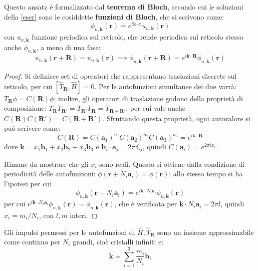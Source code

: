 \documentclass[10pt, a4paper]{scrartcl}
\numberwithin{equation}{subsection}
\theoremstyle{style1}
\begin{document}
Questo ansatz \`e formalizzato dal \textbf{teorema di Bloch}, secondo cui le soluzioni della \ref{eser} sono le cosiddette \textbf{funzioni di Bloch}, che si scrivono come:
\begin{equation}
	\phi _{n, \mathbf{k} } (\mathbf{r} ) = e^{i \mathbf{k} \cdot \mathbf{r} } u _{n, \mathbf{k} } (\mathbf{r} )
\end{equation}
con $u_{n, \mathbf{k} } $ funzione periodica sul reticolo, che rende periodica sul reticolo stesso anche  $\phi _{n,\mathbf{k} } $, a meno di una fase:
\[
u_{n,\mathbf{k} } (\mathbf{r} + \mathbf{R} ) = u_{n,\mathbf{k} } (\mathbf{r} ) \implies \phi _{n,\mathbf{k} } (\mathbf{r} + \mathbf{R} ) = e^{i \mathbf{k} \cdot \mathbf{R} } \phi _{n,\mathbf{k} } (\mathbf{r} ) 
\] 
\begin{proof}
	Si  definisce set di operatori che rappresentano traslazioni discrete sul reticolo, per cui $[\hat{T}_\mathbf{R} , \hat{H}] = 0$. Per le autofunzioni simultanee dei due varr\`a: $T_\mathbf{R} \phi  = C(\mathbf{R} ) \phi $; inoltre, gli operatori di traslazione godono della propriet\`a di composizione: $T_\mathbf{R} T_{\mathbf{R}'}  = T_{\mathbf{R} '}  T_\mathbf{R} = T_{\mathbf{R} + \mathbf{R} '} $, per cui vale anche $C(\mathbf{R} ) C(\mathbf{R} ') = C(\mathbf{R} +\mathbf{R} ')$. Sfruttando questa propriet\`a, ogni autovalore si pu\`o scrivere come:
	\begin{equation}
		C( \mathbf{R} ) = C( \mathbf{a} _1) ^{n_1} C(\mathbf{a} _2)^{n_2} C(\mathbf{a} _3) ^{n_3} = e^{ i \mathbf{k} \cdot \mathbf{R} } 
	\end{equation}
dove $\mathbf{k} = x_1 \mathbf{b} _1 + x_2 \mathbf{b} _2  + x_3 \mathbf{b} _3$ e $\mathbf{b} _i \cdot \mathbf{a}_j = 2\pi \delta _{ij} $, quindi $C(\mathbf{a} _i) = e^{2 \pi i x_i} $. 

Rimane da mostrare che gli $x_i$ sono reali. 
Questo si ottiene dalla condizione di periodicit\`a delle autofunzioni: $\phi (\mathbf{r} + N_i \mathbf{a}_i) = \phi (\mathbf{r} ) $; allo stesso tempo si ha l'ipotesi per cui
\[
\phi _{n, \mathbf{k} } (\mathbf{r} + N_i \mathbf{a} _i) = e^{i \mathbf{k} \cdot N_i \mathbf{a} _i} \phi _{n , \mathbf{k} } (\mathbf{r} )
\] 
per cui $e^{i \mathbf{k} \cdot N_i \mathbf{a}_i } \phi _{n, \mathbf{k} } (\mathbf{r} ) = \phi _{n , \mathbf{k} } (\mathbf{r} )$, che \`e verificata per $\mathbf{k} \cdot N_i \mathbf{a} _i = 2\pi l $, quindi $x_i = m_i /  N_i$, con $l , m$ interi.
\end{proof}
Gli impulsi permessi per le autofunzioni di $\hat{H}, \hat{T}_\mathbf{R} $ sono un insieme approssimabile come continuo per $N_i$ grandi, cio\`e cristalli infiniti e:
\begin{equation}
	\mathbf{k} = \sum_{i=1}^{3} \frac{m_i}{N_i} \mathbf{b} _i
\end{equation}
\end{document}
